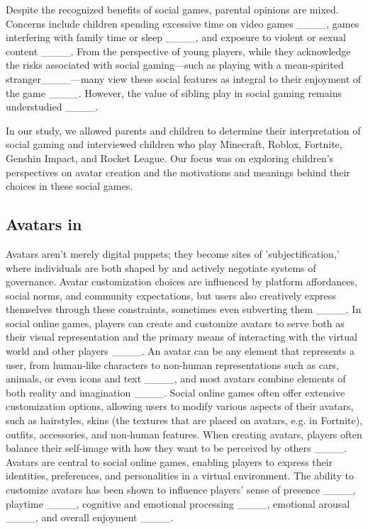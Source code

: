 Despite the recognized benefits of social games, parental opinions are mixed. Concerns include children spending excessive time on video games ____, games interfering with family time or sleep ____, and exposure to violent or sexual content ____. From the perspective of young players, while they acknowledge the risks associated with social gaming—such as playing with a mean-spirited stranger____—many view these social features as integral to their enjoyment of the game ____. However, the value of sibling play in social gaming remains understudied ____.

In our study, we allowed parents and children to determine their interpretation of social gaming and interviewed children who play Minecraft, Roblox, Fortnite, Genshin Impact, and Rocket League. Our focus was on exploring children’s perspectives on avatar creation and the motivations and meanings behind their choices in these social games.

\subsection{Avatars in }
Avatars aren't merely digital puppets; they become sites of 'subjectification,' where individuals are both shaped by and actively negotiate systems of governance. Avatar customization choices are influenced by platform affordances, social norms, and community expectations, but users also creatively express themselves through these constraints, sometimes even subverting them ____. In social online games, players can create and customize avatars to serve both as their visual representation and the primary means of interacting with the virtual world and other players ____. An avatar can be any element that represents a user, from human-like characters to non-human representations such as cars, animals, or even icons and text ____, and most avatars combine elements of both reality and imagination ____. Social online games often offer extensive customization options, allowing users to modify various aspects of their avatars, such as hairstyles, skins (the textures that are placed on avatars, e.g. in Fortnite), outfits, accessories, and non-human features. When creating avatars, players often balance their self-image with how they want to be perceived by others ____. Avatars are central to social online games, enabling players to express their identities, preferences, and personalities in a virtual environment. The ability to customize avatars has been shown to influence players’ sense of presence ____, playtime ____, cognitive and emotional processing ____, emotional arousal ____,  and overall enjoyment ____. 

